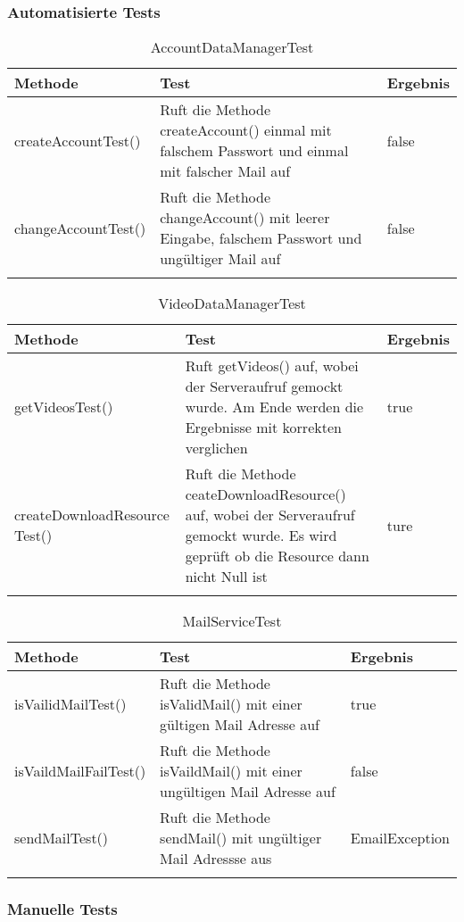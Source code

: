 \subsubsection{Automatisierte Tests}
 \begin{longtable}{p{} | p{} | p{}}
\hline
  \textbf{Methode} & \textbf{Test} & \textbf{Ergebnis}\\
  \hline
  createAccountTest() & Ruft die Methode createAccount() einmal mit falschem Passwort und einmal mit falscher Mail auf& false\\
  \hline
  changeAccountTest() & Ruft die Methode changeAccount() mit leerer Eingabe, falschem Passwort und ungültiger Mail auf & false\\
  \hline
  \caption{AccountDataManagerTest}
 \end{longtable}
 
  \begin{longtable}{p{} | p{} | p{}}
\hline
  \textbf{Methode} & \textbf{Test} & \textbf{Ergebnis}\\
  \hline
  getVideosTest() & Ruft getVideos() auf, wobei der Serveraufruf gemockt wurde. Am Ende werden die Ergebnisse mit korrekten verglichen & true\\
  \hline
  createDownloadResource Test() & Ruft die Methode ceateDownloadResource() auf, wobei der Serveraufruf gemockt wurde. Es wird geprüft ob die Resource dann nicht Null ist & ture\\
  \hline
  \caption{VideoDataManagerTest}
 \end{longtable}
 
   \begin{longtable}{p{} | p{} | p{}}
\hline
  \textbf{Methode} & \textbf{Test} & \textbf{Ergebnis}\\
  \hline
  isVailidMailTest() & Ruft die Methode isValidMail() mit einer gültigen Mail Adresse auf & true\\
  \hline
  isVaildMailFailTest() & Ruft die Methode isVaildMail() mit einer ungültigen Mail Adresse auf & false\\
  \hline
  sendMailTest() & Ruft die Methode sendMail() mit ungültiger Mail Adressse aus & EmailException\\
  \hline
  \caption{MailServiceTest}
 \end{longtable}
 
 
\subsubsection{Manuelle Tests}

